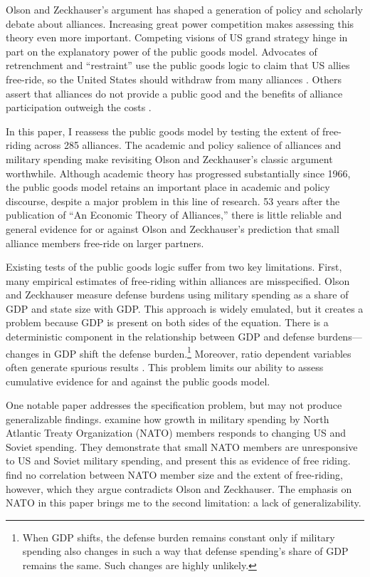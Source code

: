 \documentclass[12pt]{article}
\begin{document}
Olson and Zeckhauser's argument has shaped a generation of policy and scholarly debate about alliances. 
Increasing great power competition makes assessing this theory even more important. 
Competing visions of US grand strategy hinge in part on the explanatory power of the public goods model. 
Advocates of retrenchment and ``restraint'' use the public goods logic to claim that US allies free-ride, so the United States should withdraw from many alliances \citep{Preble2009, Posen2014}. 
Others assert that alliances do not provide a public good and the benefits of alliance participation outweigh the costs \citep{Brooksetal2013, BrandsFeaver2017}. 


In this paper, I reassess the public goods model by testing the extent of free-riding across 285 alliances. 
The academic and policy salience of alliances and military spending make revisiting Olson and Zeckhauser's classic argument worthwhile.
Although academic theory has progressed substantially since 1966, the public goods model retains an important place in academic and policy discourse, despite a major problem in this line of research.
53 years after the publication of ``An Economic Theory of Alliances,'' there is little reliable and general evidence for or against Olson and Zeckhauser's prediction that small alliance members free-ride on larger partners. 


Existing tests of the public goods logic suffer from two key limitations.
First, many empirical estimates of free-riding within alliances are misspecified.
Olson and Zeckhauser measure defense burdens using military spending as a share of GDP and state size with GDP.
This approach is widely emulated, but it creates a problem because GDP is present on both sides of the equation.
There is a deterministic component in the relationship between GDP and defense burdens--- changes in GDP shift the defense burden.\footnote{
When GDP shifts, the defense burden remains constant only if military spending also changes in such a way that defense spending's share of GDP remains the same. Such changes are highly unlikely.}  
Moreover, ratio dependent variables often generate spurious results \citep{Kronmal1993}.
This problem limits our ability to assess cumulative evidence for and against the public goods model. 
 

One notable paper addresses the specification problem, but may not produce generalizable findings. 
\citet{PluemperNeumayer2015} examine how growth in military spending by North Atlantic Treaty Organization (NATO) members responds to changing US and Soviet spending.
They demonstrate that small NATO members are unresponsive to US and Soviet military spending, and present this as evidence of free riding.
\citet{PluemperNeumayer2015} find no correlation between NATO member size and the extent of free-riding, however, which they argue contradicts Olson and Zeckhauser.
The emphasis on NATO in this paper brings me to the second limitation: a lack of generalizability. 
\end{document}

